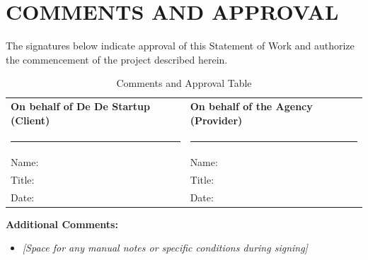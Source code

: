 \chapter{COMMENTS AND APPROVAL}

The signatures below indicate approval of this Statement of Work and authorize the commencement of the project described herein.

\vspace{2cm}

\begin{table}[h!]
\centering
\renewcommand{\arraystretch}{2}
\begin{tabular}{p{} p{}}
\textbf{On behalf of De De Startup (Client)} & \textbf{On behalf of the Agency (Provider)} \\
\rule{6cm}{0.4pt} & \rule{6cm}{0.4pt} \\
Name: & Name: \\
Title: & Title: \\
Date: & Date: \\
\end{tabular}
\caption{Comments and Approval Table}
\end{table}

\vspace{1cm}
\textbf{Additional Comments:}
\begin{itemize}
    \item \textit{[Space for any manual notes or specific conditions during signing]}
\end{itemize}